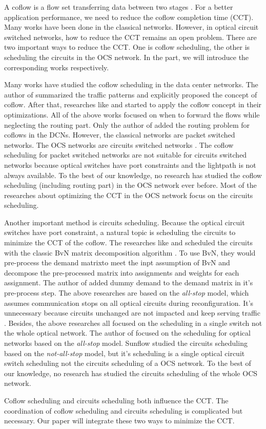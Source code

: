 A coflow is a flow set transferring data between two stages \cite{chowdhury2012coflow}. For a better application performance, we need to reduce the coflow completion time (CCT). Many works have been done in the classical networks. However, in optical circuit switched networks, how to reduce the CCT remains an open problem. There are two important ways to reduce the CCT. One is coflow scheduling, the other is scheduling the circuits in the OCS network. In the part, we will introduce the corresponding works respectively.

Many works have studied the coflow scheduling in the data center networks. The author of \cite{chowdhury2012coflow} summarized the traffic patterns and explicitly proposed the concept of coflow. After that, researches like \cite{chowdhury2014efficient} and \cite{dogar2014decentralized} started to apply the coflow concept in their optimizations. All of the above works focused on when to forward the flows while neglecting the routing part. Only the author of \cite{zhao2015rapier} added the routing problem for coflows in the DCNs. However, the classical networks are packet switched networks. The OCS networks are circuits switched networks \cite{huang2016sunflow}. The coflow scheduling for packet switched networks are not suitable for circuits switched networks because optical switches have port constraints and the lightpath is not always available. To the best of our knowledge, no research has studied the coflow scheduling (including routing part) in the OCS network ever before. Most of the researches about optimizing the CCT in the OCS network focus on the circuits scheduling.

Another important method is circuits scheduling. Because the optical circuit switches have port constraint, a natural topic is scheduling the circuits to minimize the CCT of the coflow. The researches like \cite{farrington2012hunting} and \cite{porter2013integrating} scheduled the circuits with the classic BvN matrix decomposition algorithm \cite{birkhoff1946tres}. To use BvN, they would pre-process the demand matrixto meet the inpt assumption of BvN and decompose the pre-processed matrix into assignments and weights for each assignment. The author of \cite{liu2015scheduling} added dummy demand to the demand matrix in it's pre-process step. The above researches are based on the \emph{all-stop} model, which assumes communication stops on all optical circuits during reconfiguration. It's unnecessary because circuits unchanged are not impacted and keep serving traffic \cite{huang2016sunflow}. Besides, the above researches all focused on the scheduling in a single switch not the whole optical network. The author of \cite{wang2015end} focused on the scheduling for optical networks based on the \emph{all-stop} model. Sunflow \cite{huang2016sunflow} studied the circuits scheduling based on the \emph{not-all-stop} model, but it's scheduling is a single optical circuit switch scheduling not the circuits scheduling of a OCS network. To the best of our knowledge, no research has studied the circuits scheduling of the whole OCS network.

Coflow scheduling and circuits scheduling both influence the CCT. The coordination of coflow scheduling and circuits scheduling is complicated but necessary.  Our paper will integrate these two ways to minimize the CCT.



